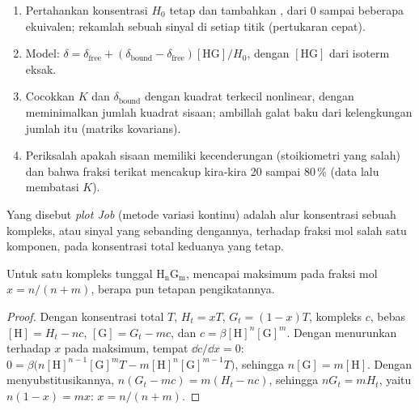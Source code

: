 \begin{method}\label{met:b3:supramolecular:nmr-titration}
\begin{enumerate}
  \item Pertahankan konsentrasi  $H_0$ tetap dan tambahkan , dari 0 sampai beberapa
        ekuivalen; rekamlah sebuah sinyal  di setiap titik (pertukaran cepat).
  \item Model: $\delta = \delta_{\mathrm{free}} + (\delta_{\mathrm{bound}} - \delta_{\mathrm{free}})[\mathrm{HG}]/H_0$, dengan $[\mathrm{HG}]$ dari isoterm eksak.
  \item Cocokkan $K$ dan $\delta_{\mathrm{bound}}$ dengan kuadrat terkecil nonlinear, dengan meminimalkan jumlah kuadrat
        sisaan; ambillah galat baku dari kelengkungan jumlah itu
        (matriks kovarians).
  \item Periksalah apakah sisaan memiliki kecenderungan (stoikiometri yang salah) dan bahwa
        fraksi terikat mencakup kira-kira 20 sampai 80\,\% (data lalu membatasi $K$).
\end{enumerate}
\end{method}

\begin{definition}\label{def:b3:supramolecular:job}
Yang disebut \emph{plot Job} (metode variasi kontinu) adalah alur
konsentrasi sebuah kompleks, atau sinyal yang sebanding dengannya, terhadap
fraksi mol salah satu komponen, pada konsentrasi total keduanya yang
tetap.
\end{definition}

\begin{proposition}\label{prop:b3:supramolecular:job}
Untuk satu kompleks tunggal $\mathrm{H_nG_m}$,  mencapai maksimum pada fraksi mol 
$x = n/(n + m)$, berapa pun tetapan pengikatannya.
\end{proposition}

\begin{proof}
Dengan konsentrasi total $T$, $H_t = xT$, $G_t = (1 - x)T$, kompleks $c$, bebas $[\mathrm H] = H_t - nc$,
$[\mathrm G] = G_t - mc$, dan $c = \beta[\mathrm H]^n[\mathrm G]^m$. Dengan menurunkan terhadap $x$ pada maksimum, tempat
$\dd c/\dd x = 0$: $0 = \beta\bigl(n[\mathrm H]^{n-1}[\mathrm G]^m T - m[\mathrm H]^n[\mathrm G]^{m-1}T\bigr)$, sehingga $n[\mathrm G] = m[\mathrm H]$. Dengan menyubstitusikannya,
$n(G_t - mc) = m(H_t - nc)$, sehingga $nG_t = mH_t$, yaitu $n(1 - x) = mx$: $x = n/(n + m)$.
\end{proof}

